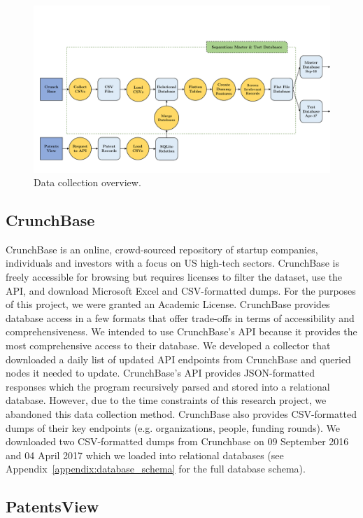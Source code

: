 \documentclass[../thesis/thesis.tex]{subfiles}
\begin{document}
\begin{figure}[!htb]
    \centering
    \includegraphics[width=\textwidth]{../figures/design/data_collection}
    \caption{Data collection overview.}
    \label{fig:design:data_collection}
\end{figure}

\subsection{CrunchBase}

CrunchBase is an online, crowd-sourced repository of startup companies, individuals and investors with a focus on US high-tech sectors. CrunchBase is freely accessible for browsing but requires licenses to filter the dataset, use the API, and download Microsoft Excel and CSV-formatted dumps. For the purposes of this project, we were granted an Academic License. CrunchBase provides database access in a few formats that offer trade-offs in terms of accessibility and comprehensiveness. We intended to use CrunchBase's API because it provides the most comprehensive access to their database. We developed a collector that downloaded a daily list of updated API endpoints from CrunchBase and queried nodes it needed to update. CrunchBase's API provides JSON-formatted responses which the program recursively parsed and stored into a relational database. However, due to the time constraints of this research project, we abandoned this data collection method. CrunchBase also provides CSV-formatted dumps of their key endpoints (e.g. organizations, people, funding rounds). We downloaded two CSV-formatted dumps from Crunchbase on 09 September 2016 and 04 April 2017 which we loaded into relational databases (see Appendix~\ref{appendix:database_schema} for the full database schema).

\subsection{PatentsView}
\end{document}
